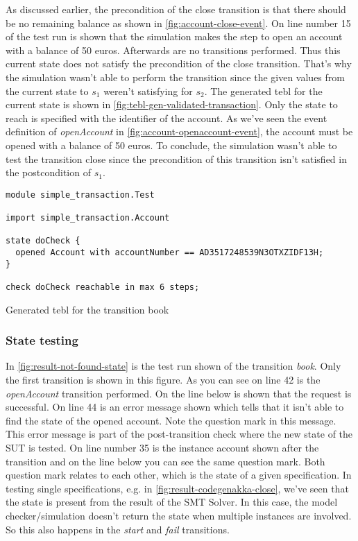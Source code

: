 As discussed earlier, the precondition of the close transition is that there
should be no remaining balance as shown in \autoref{fig:account-close-event}.
On line number 15 of the test run is shown that the simulation makes the step to
open an account with a balance of 50 euros. Afterwards are no transitions
performed. Thus this current state does not satisfy the precondition of the
close transition. That's why the simulation wasn't able to perform the
transition since the given values from the current state to $s_{1}$ weren't
satisfying for $s_{2}$. The generated tebl for the current state is shown in
\autoref{fig:tebl-gen-validated-transaction}. Only the state to reach is
specified with the identifier of the account. As we've seen the event definition
of \textit{openAccount} in \autoref{fig:account-openaccount-event}, the account
must be opened with a balance of 50 euros.
To conclude, the simulation wasn't able to test the transition close since the
precondition of this transition isn't satisfied in the postcondition of $s_{1}$.

\begin{sourcecode}[h!]
\begin{lstlisting}[]
module simple_transaction.Test

import simple_transaction.Account

state doCheck {
  opened Account with accountNumber == AD3517248539N3OTXZIDF13H;
}

check doCheck reachable in max 6 steps;
\end{lstlisting}
\caption{Generated tebl for the transition book}
\label{fig:tebl-gen-validated-transaction}
\end{sourcecode}

\subsubsection{State testing}

In \autoref{fig:result-not-found-state} is the test run shown of the transition
\textit{book}. Only the first transition is shown in this figure. As you can
see on line 42 is the \textit{openAccount} transition performed. On the line
below is shown that the request is successful. On line 44 is an error message
shown which tells that it isn't able to find the state of the opened account.
Note the question mark in this message. This error message is part of the
post-transition check where the new state of the SUT is tested. On line number
35 is the instance account shown after the transition and on the line below you
can see the same question mark. Both question mark relates to each other, which
is the state of a given specification. In testing single specifications, e.g. in
\autoref{fig:result-codegenakka-close}, we've seen that the state is present
from the result of the SMT Solver. In this case, the model checker/simulation
doesn't return the state when multiple instances are involved. So this also
happens in the \textit{start} and \textit{fail} transitions.

